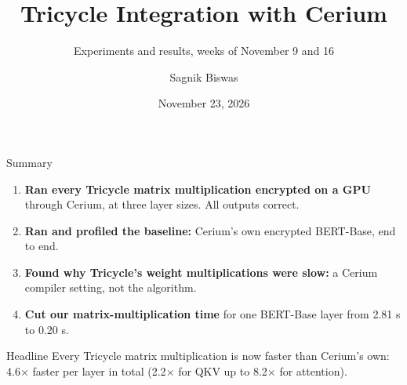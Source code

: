 \documentclass[aspectratio=169]{beamer}
\title{Tricycle Integration with Cerium}
\subtitle{Experiments and results, weeks of November 9 and 16}
\author{Sagnik Biswas}
\date{November 23, 2026}
\begin{document}
\begin{frame}
  \titlepage
\end{frame}

\begin{frame}{Summary}
\small
\begin{enumerate}\small
  \item \textbf{Ran every Tricycle matrix multiplication encrypted on a GPU} through Cerium, at three layer sizes. All outputs correct.
  \item \textbf{Ran and profiled the baseline:} Cerium's own encrypted BERT-Base, end to end.
  \item \textbf{Found why Tricycle's weight multiplications were slow:} a Cerium compiler setting, not the algorithm.
  \item \textbf{Cut our matrix-multiplication time} for one BERT-Base layer from 2.81 s to 0.20 s.
\end{enumerate}
\vspace{0.6em}
\begin{block}{Headline}
Every Tricycle matrix multiplication is now faster than Cerium's own: 4.6$\times$ faster per layer in total (2.2$\times$ for QKV up to 8.2$\times$ for attention).
\end{block}
\end{frame}
\end{document}
